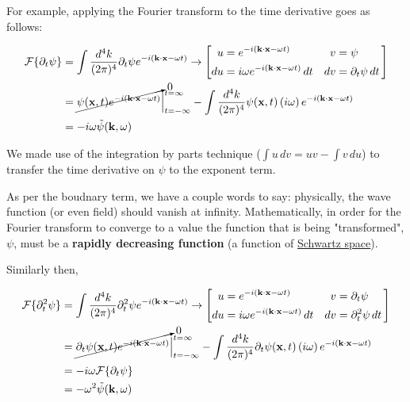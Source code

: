 For example, applying the Fourier transform to the time derivative goes as follows:

\begin{align*}
\mathcal{F}\{ \partial_t \psi \} &=
    \int \frac{d^4k}{(2\pi)^4} \partial_t \psi e^{-i(\boldsymbol{\mathbf{k}}\cdot\boldsymbol{\mathbf{x}} - \omega t)}
\rightarrow
\left[
    \begin{alignedat}{2}
        u  &= e^{-i(\boldsymbol{\mathbf{k}}\cdot\boldsymbol{\mathbf{x}} - \omega t)}                \quad & v  &= \psi \\
        du &= i\omega e^{-i(\boldsymbol{\mathbf{k}}\cdot\boldsymbol{\mathbf{x}} - \omega t)} \, dt  \quad & dv &= \partial_t \psi \, dt
    \end{alignedat}\,
\right] \\
&= \cancelto{0}{ \psi(\boldsymbol{\mathbf{x}}, t) e^{-i(\boldsymbol{\mathbf{k}}\cdot\boldsymbol{\mathbf{x}} - \omega t)} } \Big|_{t=-\infty}^{t=\infty}
    - \int \frac{d^4k}{(2\pi)^4} \psi(\boldsymbol{\mathbf{x}}, t) \left(i\omega\right) e^{-i(\boldsymbol{\mathbf{k}}\cdot\boldsymbol{\mathbf{x}} - \omega t)} \\
&= -i\omega \tilde{\psi} (\boldsymbol{\mathbf{k}}, \omega)
\end{align*}

We made use of the integration by parts technique ($\int u \, dv = uv - \int v \, du$) to transfer the time derivative
on $\psi$ to the exponent term.

As per the boudnary term, we have a couple words to say: physically, the wave function (or even field) should vanish at infinity.
Mathematically, in order for the Fourier transform to converge to a value the function that is being "transformed", $\psi$,
must be a \textbf{rapidly decreasing function} (a function of \href{https://en.wikipedia.org/wiki/Schwartz_space}{Schwartz space}).

Similarly then,

\begin{align*}
\mathcal{F}\{ \partial_{t}^2 \psi \} &=
    \int \frac{d^4k}{(2\pi)^4} \partial_{t}^{2} \psi e^{-i(\boldsymbol{\mathbf{k}}\cdot\boldsymbol{\mathbf{x}} - \omega t)}
\rightarrow
\left[
    \begin{alignedat}{2}
        u  &= e^{-i(\boldsymbol{\mathbf{k}}\cdot\boldsymbol{\mathbf{x}} - \omega t)}                \quad & v  &= \partial_t \psi \\
        du &= i\omega e^{-i(\boldsymbol{\mathbf{k}}\cdot\boldsymbol{\mathbf{x}} - \omega t)} \, dt  \quad & dv &= \partial_{t}^{2} \psi \, dt
    \end{alignedat}\,
\right] \\
&= \cancelto{0}{ \partial _t \psi(\boldsymbol{\mathbf{x}}, t) e^{-i(\boldsymbol{\mathbf{k}}\cdot\boldsymbol{\mathbf{x}} - \omega t)} } \Big|_{t=-\infty}^{t=\infty}
    - \int \frac{d^4k}{(2\pi)^4} \partial_t \psi(\boldsymbol{\mathbf{x}}, t) \left(i\omega\right) e^{-i(\boldsymbol{\mathbf{k}}\cdot\boldsymbol{\mathbf{x}} - \omega t)} \\
&= -i\omega \mathcal{F}\{ \partial_t \psi \} \\
&= - \omega^2 \tilde{\psi} (\boldsymbol{\mathbf{k}}, \omega)
\end{align*}

